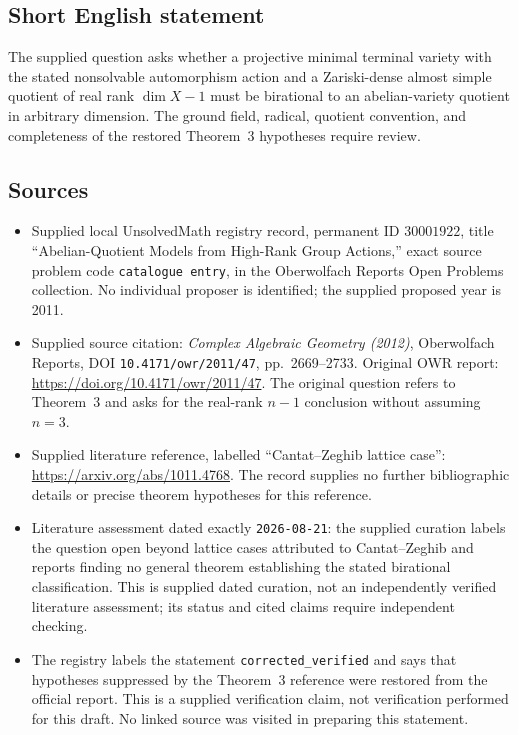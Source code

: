 \documentclass[11pt]{article}
\begin{document}
\subsection{Short English statement}
The supplied question asks whether a projective minimal terminal variety with the stated nonsolvable automorphism action and a Zariski-dense almost simple quotient of real rank \(\dim X-1\) must be birational to an abelian-variety quotient in arbitrary dimension. The ground field, radical, quotient convention, and completeness of the restored Theorem~3 hypotheses require review.
\subsection{Sources}
\begin{itemize}
\item Supplied local UnsolvedMath registry record, permanent ID \(30001922\), title ``Abelian-Quotient Models from High-Rank Group Actions,'' exact source problem code \texttt{catalogue entry}, in the Oberwolfach Reports Open Problems collection. No individual proposer is identified; the supplied proposed year is 2011.
\item Supplied source citation: \emph{Complex Algebraic Geometry (2012)}, Oberwolfach Reports, DOI \texttt{10.4171/owr/2011/47}, pp.~2669--2733. Original OWR report: \url{https://doi.org/10.4171/owr/2011/47}. The original question refers to Theorem~3 and asks for the real-rank \(n-1\) conclusion without assuming \(n=3\).
\item Supplied literature reference, labelled ``Cantat--Zeghib lattice case'': \url{https://arxiv.org/abs/1011.4768}. The record supplies no further bibliographic details or precise theorem hypotheses for this reference.
\item Literature assessment dated exactly \texttt{2026-08-21}: the supplied curation labels the question open beyond lattice cases attributed to Cantat--Zeghib and reports finding no general theorem establishing the stated birational classification. This is supplied dated curation, not an independently verified literature assessment; its status and cited claims require independent checking.
\item The registry labels the statement \texttt{corrected\_verified} and says that hypotheses suppressed by the Theorem~3 reference were restored from the official report. This is a supplied verification claim, not verification performed for this draft. No linked source was visited in preparing this statement.
\end{itemize}
\end{document}
